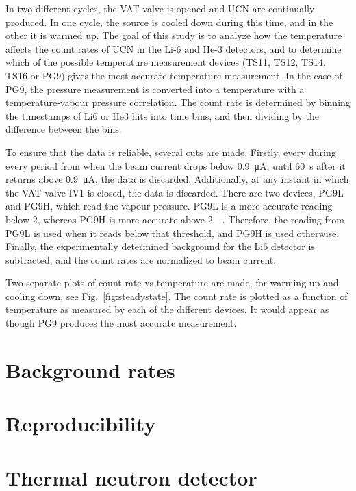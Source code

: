 \documentclass[10pt,letterpaper]{article}
\begin{document}
In two different cycles, the VAT valve is opened and UCN are continually produced. In one cycle, the source is cooled down during this time, and in the other it is warmed up. The goal of this study is to analyze how the temperature affects the count rates of UCN in the Li-6 and He-3 detectors, and to determine which of the possible temperature measurement devices (TS11, TS12, TS14, TS16 or PG9) gives the most accurate temperature measurement. In the case of PG9, the pressure measurement is converted into a temperature with a temperature-vapour pressure correlation. The count rate is determined by binning the timestamps of Li6 or He3 hits into time bins, and then dividing by the difference between the bins.

To ensure that the data is reliable, several cuts are made. Firstly, every during every period from when the beam current drops below \SI{0.9}{\micro\ampere}, until \SI{60}{\second} after it returns above \SI{0.9}{\micro\ampere}, the data is discarded. Additionally, at any instant in which the VAT valve IV1 is closed, the data is discarded. There are two devices, PG9L and PG9H, which read the vapour pressure. PG9L is a more accurate reading below \SI{2}{\torr}, whereas PG9H is more accurate above \SI{2}{\milli\torr}. Therefore, the reading from PG9L is used when it reads below that threshold, and PG9H is used otherwise. Finally, the experimentally determined background for the Li6 detector is subtracted, and the count rates are normalized to beam current.

Two separate plots of count rate vs temperature are made, for warming up and cooling down, see Fig.~\ref{fig:steadystate}. The count rate is plotted as a function of temperature as measured by each of the different devices. It would appear as though PG9 produces the most accurate measurement.





\section{Background rates}
\label{sec:background}



\section{Reproducibility}


\section{Thermal neutron detector}
\end{document}
